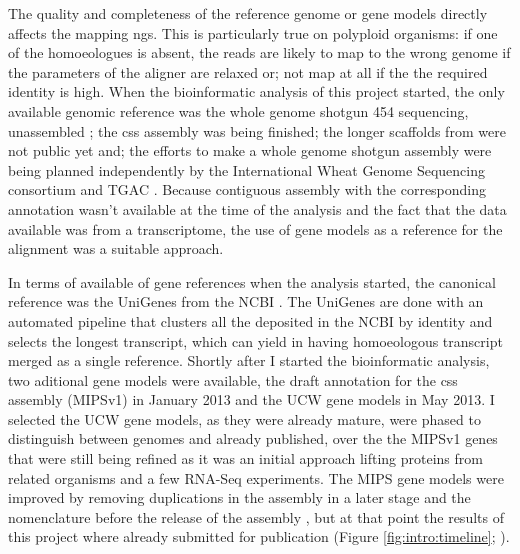 The quality and completeness  of the reference genome or gene models directly affects the mapping \acrshort{ngs}. 
This is particularly true on polyploid organisms: if one of the homoeologues is absent, the reads are likely to map to the wrong genome if the parameters of the aligner are relaxed or; not map at all if the the required identity is high.
When the bioinformatic analysis of this project started, the only available genomic reference was the whole genome shotgun 454 sequencing, unassembled \citep{Brenchley2012}; the \gls{css} assembly was being finished\citep{Mayer2014}; the longer scaffolds from \citet{Chapman2015} were not public yet and; the efforts to make a whole genome shotgun assembly were being planned independently by the International Wheat Genome Sequencing consortium  \citep{Pozniak2016} and TGAC \citep{Clark2016}.  
Because contiguous assembly with the corresponding annotation wasn't available at the time of the analysis and the fact that the data available was from a transcriptome, the use of gene models as a reference for the alignment was a suitable approach. 

In terms of available of gene references when the analysis started, the canonical reference was the UniGenes from the NCBI \citep{PontiusJUWagnerL2002}. 
The UniGenes are done with an automated pipeline that clusters all the  deposited in the NCBI by identity and selects the longest transcript, which can yield in having homoeologous transcript merged as a single reference.
Shortly after I started the bioinformatic analysis, two aditional gene models were available, the draft annotation for the \acrshort{css} assembly (MIPSv1) in January 2013 and the UCW gene models \citep{Krasileva2013} in May 2013. 
I selected the UCW gene models, as they were already mature, were phased to distinguish between genomes and already published, over the the MIPSv1 genes that were still being refined as it was an initial approach lifting proteins from related organisms and a few RNA-Seq experiments.  
The MIPS gene models were improved by removing duplications in the assembly in a later stage and the nomenclature before the release of the assembly \citep{Mayer2014}, but at that point the results of this project where already submitted for publication (Figure \ref{fig:intro:timeline}; \citealt{Ramirez-Gonzalez2015b}). 

